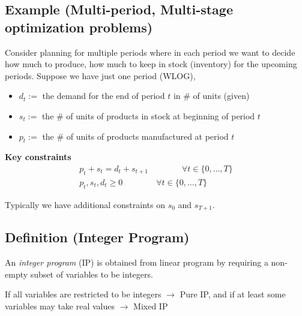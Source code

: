 \subsection{Example (Multi-period, Multi-stage optimization problems)}
Consider planning for multiple periods where in each period we
want to decide how much to produce, how much to keep in stock
(inventory) for the upcoming periods. Suppose we have just one period
(WLOG),
\begin{itemize}
    \item $d_t:=$ the demand for the end of period $t$ in \# of units (given)
    \item $s_t:=$ the \# of units of products in stock at beginning of period $t$
    \item $p_t:=$ the \# of units of products manufactured at period $t$
\end{itemize}
\textbf{Key constraints}
\begin{align*}
    p_t+s_t=d_t+s_{t+1} \qquad\qquad \forall t\in \{0,\dots,T\}\\
    p_t,s_t,d_t\ge 0 \qquad\qquad \forall t\in \{0,\dots,T\}
\end{align*}
\begin{remark}
    Typically we have additional constraints on $s_0$ and $s_{T+1}$.
\end{remark}

\begin{defbox}
    \subsection{Definition (Integer Program)}
    An \emph{integer program} (IP) is obtained from linear program 
    by requiring a non-empty subset of variables to be integers.
\end{defbox}

\begin{remark}
    If all variables are restricted to be integers $\rightarrow$ Pure IP,
    and if at least some variables may take real values $\rightarrow$ Mixed IP
\end{remark}
